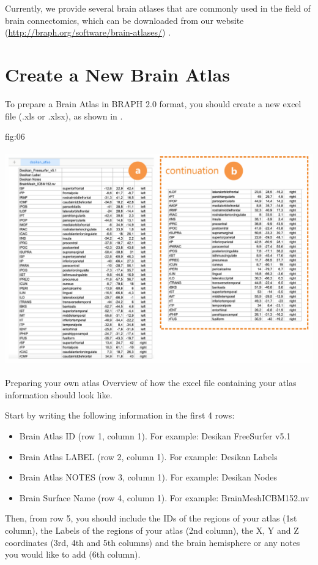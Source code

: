 \documentclass[justified]{tufte-handout}
\begin{document}
Currently, we provide several brain atlases that are commonly used in the field of brain connectomics, which can be downloaded from our website (\url{http://braph.org/software/brain-atlases/}) .

\clearpage
\section{Create a New Brain Atlas}

To prepare a Brain Atlas in BRAPH 2.0 format, you should create a new excel file (.xls or .xlsx), as shown in . 

	{fig:06}
	{\includegraphics[height=10cm]{tut_ba/fig06.png}}
	{Preparing your own atlas}
	{
	Overview of how the excel file containing your atlas information should look like.  
	}

Start by writing the following information in the first 4 rows:
\begin{itemize}

\item Brain Atlas ID (row 1, column 1). 
For example: Desikan FreeSurfer v5.1

\item Brain Atlas LABEL (row 2, column 1). 
For example: Desikan Labels

\item Brain Atlas NOTES (row 3, column 1).
For example: Desikan Nodes

\item Brain Surface Name (row 4, column 1).
For example: BrainMeshICBM152.nv

\end{itemize}
Then, from row 5, you should include the IDs of the regions of your atlas (1st column), the Labels of the regions of your atlas (2nd column), the X, Y and Z coordinates (3rd, 4th and 5th columns) and the brain hemisphere or any notes you would like to add (6th column).	
\end{document}
